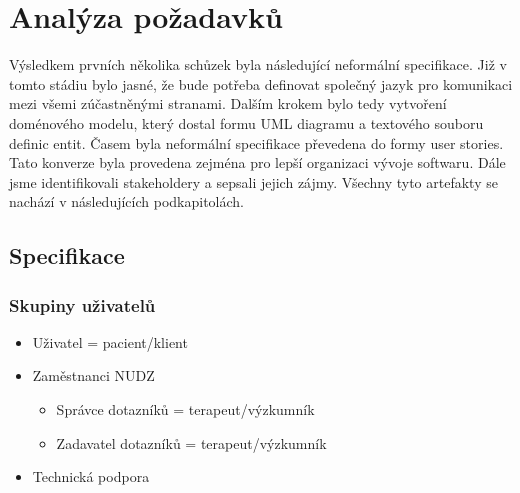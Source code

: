 \chapter{Analýza požadavků}\label{ch:analyza-pozadavku}

Výsledkem prvních několika schůzek byla následující neformální specifikace.
Již v tomto stádiu bylo jasné, že bude potřeba definovat společný jazyk pro komunikaci mezi všemi zúčastněnými stranami.
Dalším krokem bylo tedy vytvoření doménového modelu, který dostal formu UML diagramu a textového souboru definic entit.
Časem byla neformální specifikace převedena do formy user stories.
Tato konverze byla provedena zejména pro lepší organizaci vývoje softwaru.
Dále jsme identifikovali stakeholdery a sepsali jejich zájmy.
Všechny tyto artefakty se nachází v následujících podkapitolách.

\section{Specifikace}\label{sec:specifikace}

\subsection{Skupiny uživatelů}\label{subsec:skupiny-uzivatelu}

\begin{itemize}
\item
  Uživatel = pacient/klient

\item
  Zaměstnanci NUDZ

  \begin{itemize}
  \item
    Správce dotazníků = terapeut/výzkumník
  \item
    Zadavatel dotazníků = terapeut/výzkumník
  \end{itemize}
\item
  Technická podpora
\end{itemize}


